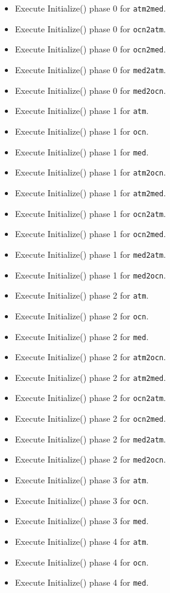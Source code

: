 \begin{itemize}
\begin{itemize}
  \item Execute Initialize() phase 0 for {\tt atm2med}.
  \item Execute Initialize() phase 0 for {\tt ocn2atm}.
  \item Execute Initialize() phase 0 for {\tt ocn2med}.
  \item Execute Initialize() phase 0 for {\tt med2atm}.
  \item Execute Initialize() phase 0 for {\tt med2ocn}.
  \item Execute Initialize() phase 1 for {\tt atm}.
  \item Execute Initialize() phase 1 for {\tt ocn}.
  \item Execute Initialize() phase 1 for {\tt med}.
  \item Execute Initialize() phase 1 for {\tt atm2ocn}.
  \item Execute Initialize() phase 1 for {\tt atm2med}.
  \item Execute Initialize() phase 1 for {\tt ocn2atm}.
  \item Execute Initialize() phase 1 for {\tt ocn2med}.
  \item Execute Initialize() phase 1 for {\tt med2atm}.
  \item Execute Initialize() phase 1 for {\tt med2ocn}.
  \item Execute Initialize() phase 2 for {\tt atm}.
  \item Execute Initialize() phase 2 for {\tt ocn}.
  \item Execute Initialize() phase 2 for {\tt med}.
  \item Execute Initialize() phase 2 for {\tt atm2ocn}.
  \item Execute Initialize() phase 2 for {\tt atm2med}.
  \item Execute Initialize() phase 2 for {\tt ocn2atm}.
  \item Execute Initialize() phase 2 for {\tt ocn2med}.
  \item Execute Initialize() phase 2 for {\tt med2atm}.
  \item Execute Initialize() phase 2 for {\tt med2ocn}.
  \item Execute Initialize() phase 3 for {\tt atm}.
  \item Execute Initialize() phase 3 for {\tt ocn}.
  \item Execute Initialize() phase 3 for {\tt med}.
  \item Execute Initialize() phase 4 for {\tt atm}.
  \item Execute Initialize() phase 4 for {\tt ocn}.
  \item Execute Initialize() phase 4 for {\tt med}.
  \end{itemize}  
\end{itemize}

